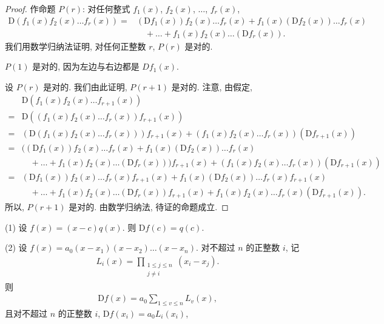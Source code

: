 \documentclass[../libro.tex]{subfiles}
\begin{document}
\begin{proof}
    作命题 \(P(r)\):
    对任何整式
    \(f_1 (x)\), \(f_2 (x)\), \(\dots\), \(f_r (x)\),
    \begin{align*}
        \mathrm{D} (f_1 (x) f_2 (x) \dots f_r (x))
        = {} &
        (\mathrm{D} f_1 (x)) f_2 (x) \dots f_r (x)
        + f_1 (x) (\mathrm{D} f_2 (x)) \dots f_r (x)
        \\
        &
        \quad
        + \dots
        + f_1 (x) f_2 (x) \dots (\mathrm{D} f_r (x)).
    \end{align*}
    我们用数学归纳法证明,
    对任何正整数 \(r\), \(P(r)\) 是对的.

    \(P(1)\) 是对的, 因为左边与右边都是 \(D f_1 (x)\).

    设 \(P(r)\) 是对的.
    我们由此证明, \(P(r+1)\) 是对的.
    注意, 由假定,
    \begin{align*}
        &
        \mathrm{D} (f_1 (x) f_2 (x) \dots f_{r+1} (x))
        \\
        = {} &
        \mathrm{D} ((f_1 (x) f_2 (x) \dots f_r (x)) f_{r+1} (x))
        \\
        = {} &
        (\mathrm{D} (f_1 (x) f_2 (x) \dots f_r (x))) f_{r+1} (x)
        + (f_1 (x) f_2 (x) \dots f_r (x)) (\mathrm{D} f_{r+1} (x))
        \\
        = {} &
        ((\mathrm{D} f_1 (x)) f_2 (x) \dots f_r (x)
            + f_1 (x) (\mathrm{D} f_2 (x)) \dots f_r (x)
            \\
            &
            \quad
            + \dots
        + f_1 (x) f_2 (x) \dots (\mathrm{D} f_r (x))) f_{r+1} (x)
        + (f_1 (x) f_2 (x) \dots f_r (x)) (\mathrm{D} f_{r+1} (x))
        \\
        = {} &
        (\mathrm{D} f_1 (x)) f_2 (x) \dots f_r (x) f_{r+1} (x)
        + f_1 (x) (\mathrm{D} f_2 (x)) \dots f_r (x) f_{r+1} (x)
        \\
        &
        \quad
        + \dots
        + f_1 (x) f_2 (x) \dots (\mathrm{D} f_r (x)) f_{r+1} (x)
        + f_1 (x) f_2 (x) \dots f_r (x) (\mathrm{D} f_{r+1} (x)).
    \end{align*}
    所以, \(P(r+1)\) 是对的.
    由数学归纳法, 待证的命题成立.
\end{proof}

\begin{theorem}
    (1)
    设 \(f(x) = (x - c) q(x)\).
    则 \(\mathrm{D} f(c) = q(c)\).

    (2)
    设 \(f(x) = a_0 (x - x_1) (x - x_2) \dots (x - x_n)\).
    对不超过 \(n\) 的正整数 \(i\), 记
    \begin{align*}
        L_i (x) = \prod_{\substack{1 \leq j \leq n \\ j \neq i}}
        {(x_i - x_j)}.
    \end{align*}
    则
    \begin{align*}
        \mathrm{D} f(x) = a_0
        \sum_{1 \leq v \leq n} {L_v (x)},
    \end{align*}
    且对不超过 \(n\) 的正整数 \(i\),
    \(\mathrm{D} f(x_i) = a_0 L_i (x_i)\),
\end{theorem}
\end{document}
